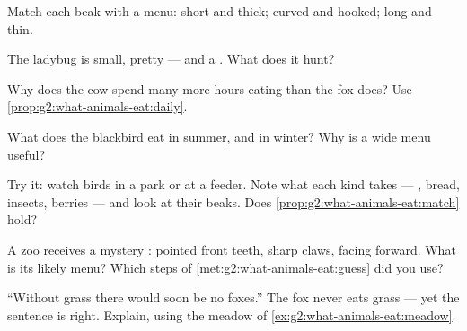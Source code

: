 \begin{exercise}[$\star$]\label{exo:g2:what-animals-eat:4}
Match each beak with a menu: short and thick; curved and hooked;
long and thin.
\end{exercise}

\begin{exercise}[$\star$]\label{exo:g2:what-animals-eat:5}
The ladybug is small, pretty --- and a . What does it
hunt?
\end{exercise}

\begin{exercise}[$\star$]\label{exo:g2:what-animals-eat:6}
Why does the cow spend many more hours eating than the fox does?
Use \cref{prop:g2:what-animals-eat:daily}.
\end{exercise}

\begin{exercise}[$\star$]\label{exo:g2:what-animals-eat:7}
What does the blackbird eat in summer, and in winter? Why is a
wide menu useful?
\end{exercise}

\begin{exercise}[$\star$]\label{exo:g2:what-animals-eat:8}
Try it: watch birds in a park or at a feeder. Note what each kind
takes --- , bread, insects, berries --- and look at their
beaks. Does \cref{prop:g2:what-animals-eat:match} hold?
\end{exercise}

\begin{exercise}[$\star\star$]\label{exo:g2:what-animals-eat:9}
A zoo receives a mystery : pointed front teeth, sharp
claws,  facing forward. What is its likely menu? Which steps
of \cref{met:g2:what-animals-eat:guess} did you use?
\end{exercise}

\begin{exercise}[$\star\star$]\label{exo:g2:what-animals-eat:10}
``Without grass there would soon be no foxes.'' The fox never
eats grass --- yet the sentence is right. Explain, using the
meadow of \cref{ex:g2:what-animals-eat:meadow}.
\end{exercise}
